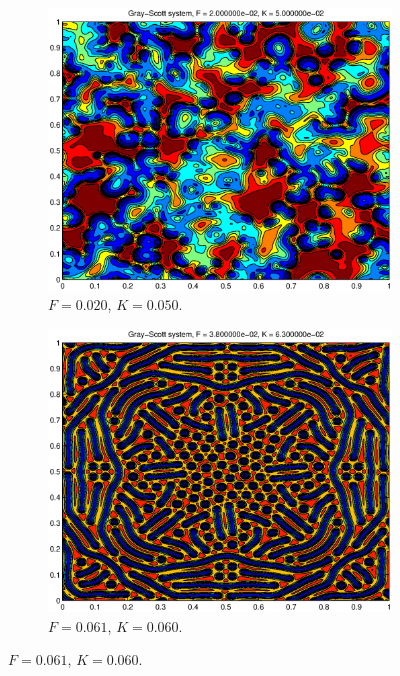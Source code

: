 \documentclass[a4paper,11pt]{article}
\begin{document}
\begin{figure}
\begin{subfigure}[b]{0.48\textwidth}
    \end{subfigure}
    \hfill
    \begin{subfigure}[b]{0.48\textwidth}
        \centering
        \includegraphics[width=\textwidth]{FK2050}
        \caption{$F = 0.020$, $K = 0.050$.}
        \label{fig:FK2050}
    \end{subfigure}
        \hfill
    \begin{subfigure}[b]{0.48\textwidth}
        \centering
        \includegraphics[width=\textwidth]{FK3863}
        \caption{$F = 0.061$, $K = 0.060$.}
        \label{figFK3863}

\end{subfigure}
\end{figure}
\end{document}
